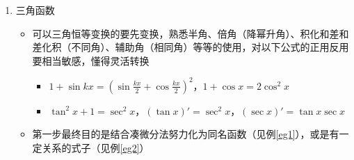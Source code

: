 \begin{enumerate}
\begin{example}
\begin{equation*}
\begin{aligned}
			&= \frac{e^x}{x+1}+\int \frac{e^x}{(x+1)^2}\diff x - \int \frac{e^x}{(x+1)^2}\diff x\qquad\mbox{刚好消掉}\\
			&= \frac{e^x}{x+1}+C
		\end{aligned}
		\end{equation*}
	\end{example}
	\begin{example}
		\label{egfrac3}
		\begin{equation*}
		\begin{aligned}
			\int\frac{x^2+2}{(x+1)^3}\diff x &= \int \frac{(x+1)^2-2(x+1)+3}{(x+1)^3}\diff x\qquad\mbox{分子几次就配几次式}\\
			&= \int \frac{\diff(x+1)}{x+1} - 2\int \frac{\diff(x+1)}{(x+1)^2} + 3\int \frac{\diff(x+1)}{(x+1)^3}\qquad\mbox{分拆}\\
			&= \ln|x+1|+\frac{2}{x+1}-\frac{3}{2}\frac{1}{(x+1)^2}+C
		\end{aligned}
		\end{equation*}
	\end{example}
	\begin{example}
		\label{egfrac4}
		\begin{equation*}
		\begin{aligned}
			\int\frac{x+1}{x^2+x+1}\diff x &= \frac{1}{2}\int \frac{(2x+1)+1}{x^2+x+1}\diff x\qquad\mbox{分子配凑为分母导数形式}\\
			&= \frac{1}{2}\int \frac{2x+1}{x^2+x+1} - \frac{1}{2}\int \frac{\diff(x+1/2)}{(x+1/2)^2+(\sqrt{3}/{2})^2}\qquad\mbox{分拆}\\
			&= \frac{1}{2}\ln|x^2+x+1|+\frac{1}{\sqrt{3}}\arctan\frac{2x+1}{\sqrt{3}}+C
		\end{aligned}
		\end{equation*}
	\end{example}
	\item 三角函数
	\begin{itemize}
		\item 可以三角恒等变换的要先变换，熟悉半角、倍角（降幂升角）、积化和差和差化积（不同角）、辅助角（相同角）等等的使用，对以下公式的正用反用要相当敏感，懂得灵活转换
		\begin{itemize}
			\item[*] $\displaystyle 1+\sin kx=\left(\sin\frac{kx}{2}+\cos\frac{kx}{2}\right)^2$，$1+\cos x=2\cos^2 x$
			\item[*] $\tan^2 x+1=\sec^2 x$，$(\tan x)'=\sec^2 x$，$(\sec x)'=\tan x\sec x$
		\end{itemize}
		\item 第一步最终目的是结合凑微分法努力化为同名函数（见例\ref{eg1}），或是有一定关系的式子（见例\ref{eg2}）

\end{itemize}
\end{enumerate}
